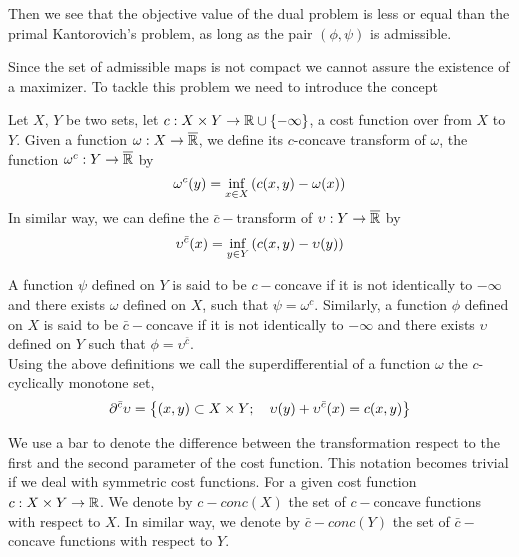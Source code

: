 Then we see that the objective value of the dual problem is less or equal than the primal Kantorovich's problem, as long as the pair $(\phi, \psi)$ is admissible.

Since the set of admissible maps is not compact we cannot assure the existence of a maximizer. To tackle this problem we need to introduce the concept  

\begin{definition}
	Let $X$, $Y$ be two sets, let $c:X\times Y \rightarrow \mathbb{R}\cup\left\lbrace -\infty \right\rbrace$, a cost function over from $X$ to $Y$. 
	Given a function $\omega: X\rightarrow \overline{\mathbb{R}}$, we define its $c$-concave transform of $\omega$, the function $\omega^c: Y\rightarrow \overline{\mathbb{R}}$ by
	\begin{equation}
	\omega^c(y)=\inf_{x\in X}\left( c(x,y)-\omega(x) \right)
	\end{equation}
	In similar way, we can define the $\bar{c}-$transform of $\upsilon: Y\rightarrow \overline{\mathbb{R}}$ by
	\begin{equation}
	\upsilon^{\bar{c}}(x)=\inf_{y\in Y}\left( c(x, y)-\upsilon(y) \right)
	\end{equation}
	
	A function $\psi$ defined on $Y$ is said to be $c-$concave if it is not identically to $-\infty$ and there exists $\omega$ defined on $X$, such that $\psi=\omega^c$. Similarly, a function $\phi$ defined on $X$ is said to be $\bar c-$concave if it is not identically to $-\infty$ and there exists $\upsilon$ defined on $Y$ such that $\phi=\upsilon^{\bar{c}}$.
	\\
	Using the above definitions we call the superdifferential of a function $\omega$ the $c$-cyclically monotone set,
	\begin{equation}
		\partial^{\bar c} \upsilon=\left\lbrace (x,y)\subset X\times Y;\quad \upsilon(y)+\upsilon^{\bar{c}}(x)=c(x,y) \right\rbrace 
	\end{equation}
\end{definition}

We use a bar to denote the difference between the transformation respect to the first and the second parameter of the cost function. This notation becomes trivial if we deal with symmetric cost functions.
For a given cost function $c:X\times Y\rightarrow \mathbb{R}$. We denote by $c-conc(X)$ the set of $c-$concave  functions with respect to $X$. In similar way, we denote by $\bar{c}-conc(Y)$ the set of $\bar{c}-$concave functions with respect to $Y$. 

